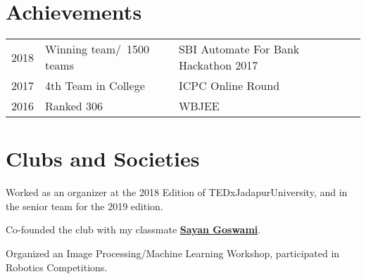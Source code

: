 \documentclass[]{deedy-resume-openfont}
\begin{document}
\begin{minipage}[t]{0.66\textwidth}

\section{Achievements} 
\begin{tabular}{rll}
2018	     & Winning team/~1500 teams  & SBI Automate For Bank Hackathon 2017\\
2017	     & 4th Team in College  & ICPC Online Round\\
2016	     & Ranked 306  & WBJEE\\
\end{tabular}
\sectionsep


\section{Clubs and Societies}
 
Worked as an organizer at the 2018 Edition of TEDxJadapurUniversity, and in the senior team for the 2019 edition.  
\sectionsep

Co-founded the club with my classmate \textbf{\href{https://github.com/Sayan98}{Sayan Goswami}}. \\
\sectionsep 

Organized an Image Processing/Machine Learning Workshop, participated in Robotics Competitions. 
\sectionsep


\end{minipage} 
\end{document}
